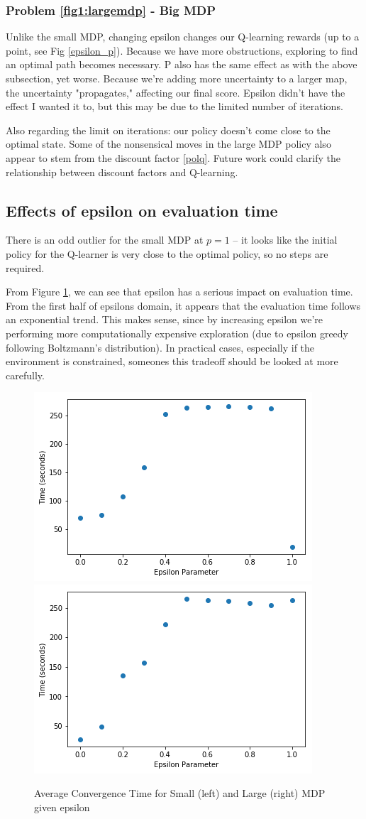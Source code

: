 \documentclass[letter]{article}
\begin{document}
\subsubsection{Problem \ref{fig1:largemdp} - Big MDP}
Unlike the small MDP, changing epsilon changes our Q-learning rewards (up to a point, see Fig \ref{epsilon_p}). Because we have more obstructions, exploring to find an optimal path becomes necessary. P also has the same effect as with the above subsection, yet worse. Because we're adding more uncertainty to a larger map, the uncertainty "propagates," affecting our final score. Epsilon didn't have the effect I wanted it to, but this may be due to the limited number of iterations.

Also regarding the limit on iterations: our policy doesn't come close to the optimal state. Some of the nonsensical moves in the large MDP policy also appear to stem from the discount factor \ref{polq}. Future work could clarify the relationship between discount factors and Q-learning.

\subsection{Effects of epsilon on evaluation time}
There is an odd outlier for the small MDP at $p=1$ -- it looks like the initial policy for the Q-learner is very close to the optimal policy, so no steps are required. 

From Figure \ref{epTime}, we can see that epsilon has a serious impact on evaluation time. From the first half of epsilons domain, it appears that the evaluation time follows an exponential trend. This makes sense, since by increasing epsilon we're performing more computationally expensive exploration (due to epsilon greedy following Boltzmann's distribution). In practical cases, especially if the environment is constrained, someones this tradeoff should be looked at more carefully.

\begin{figure}[]
    \centering
    \includegraphics[width=.4\linewidth]{epsilon_time_small.png}
    \includegraphics[width=.4\linewidth]{epsilon_time_large.png}
    \caption{Average Convergence Time for Small (left) and Large (right) MDP given epsilon}
    \label{epTime}
\end{figure}
\end{document}

